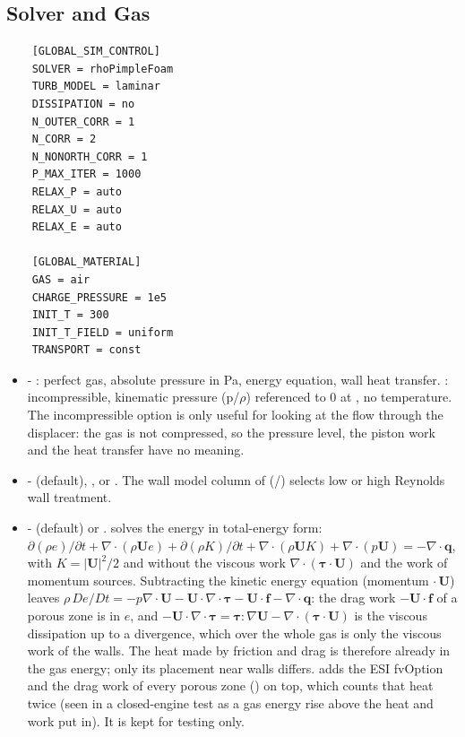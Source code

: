 \subsection{Solver and Gas}
\begin{lstlisting}
    [GLOBAL_SIM_CONTROL]
    SOLVER = rhoPimpleFoam
    TURB_MODEL = laminar
    DISSIPATION = no
    N_OUTER_CORR = 1
    N_CORR = 2
    N_NONORTH_CORR = 1
    P_MAX_ITER = 1000
    RELAX_P = auto
    RELAX_U = auto
    RELAX_E = auto

    [GLOBAL_MATERIAL]
    GAS = air
    CHARGE_PRESSURE = 1e5
    INIT_T = 300
    INIT_T_FIELD = uniform
    TRANSPORT = const
\end{lstlisting}
\begin{itemize}
    \item {} - : perfect gas, absolute pressure in Pa, energy equation, wall heat transfer. : incompressible, kinematic pressure (p/$\rho$) referenced to 0 at , no temperature. The incompressible option is only useful for looking at the flow through the displacer: the gas is not compressed, so the pressure level, the piston work and the heat transfer have no meaning.
    \item {} -  (default), ,  or . The wall model column of  (/) selects low or high Reynolds wall treatment.
    \item {} -  (default) or .  solves the energy in total-energy form: $\partial(\rho e)/\partial t + \nabla\cdot(\rho \mathbf{U} e) + \partial(\rho K)/\partial t + \nabla\cdot(\rho \mathbf{U} K) + \nabla\cdot(p\mathbf{U}) = -\nabla\cdot\mathbf{q}$, with $K = |\mathbf{U}|^2/2$ and without the viscous work $\nabla\cdot(\boldsymbol{\tau}\cdot\mathbf{U})$ and the work of momentum sources. Subtracting the kinetic energy equation (momentum $\cdot\,\mathbf{U}$) leaves $\rho\,De/Dt = -p\nabla\cdot\mathbf{U} - \mathbf{U}\cdot\nabla\cdot\boldsymbol{\tau} - \mathbf{U}\cdot\mathbf{f} - \nabla\cdot\mathbf{q}$: the drag work $-\mathbf{U}\cdot\mathbf{f}$ of a porous zone is in $e$, and $-\mathbf{U}\cdot\nabla\cdot\boldsymbol{\tau} = \boldsymbol{\tau}:\nabla\mathbf{U} - \nabla\cdot(\boldsymbol{\tau}\cdot\mathbf{U})$ is the viscous dissipation up to a divergence, which over the whole gas is only the viscous work of the walls. The heat made by friction and drag is therefore already in the gas energy; only its placement near walls differs.  adds the ESI  fvOption and the drag work of every porous zone () on top, which counts that heat twice (seen in a closed-engine test as a gas energy rise above the heat and work put in). It is kept for testing only.

\end{itemize}
